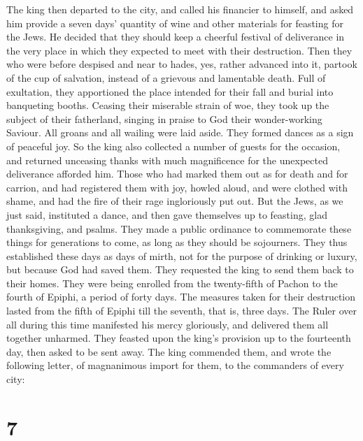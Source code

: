  The king then departed to the city, and called his
financier to himself, and asked him provide a seven days' quantity of
wine and other materials for feasting for the Jews. He decided that they
should keep a cheerful festival of deliverance in the very place in
which they expected to meet with their destruction.  Then
they who were before despised and near to hades, yes, rather advanced
into it, partook of the cup of salvation, instead of a grievous and
lamentable death. Full of exultation, they apportioned the place
intended for their fall and burial into banqueting booths. 
Ceasing their miserable strain of woe, they took up the subject of their
fatherland, singing in praise to God their wonder-working Saviour. All
groans and all wailing were laid aside. They formed dances as a sign of
peaceful joy.  So the king also collected a number of
guests for the occasion, and returned unceasing thanks with much
magnificence for the unexpected deliverance afforded him. 
Those who had marked them out as for death and for carrion, and had
registered them with joy, howled aloud, and were clothed with shame, and
had the fire of their rage ingloriously put out.  But the
Jews, as we just said, instituted a dance, and then gave themselves up
to feasting, glad thanksgiving, and psalms.  They made a
public ordinance to commemorate these things for generations to come, as
long as they should be sojourners. They thus established these days as
days of mirth, not for the purpose of drinking or luxury, but because
God had saved them.  They requested the king to send them
back to their homes.  They were being enrolled from the
twenty-fifth of Pachon to the fourth of Epiphi, a period of forty days.
The measures taken for their destruction lasted from the fifth of Epiphi
till the seventh, that is, three days.  The Ruler over all
during this time manifested his mercy gloriously, and delivered them all
together unharmed.  They feasted upon the king's provision
up to the fourteenth day, then asked to be sent away.  The
king commended them, and wrote the following letter, of magnanimous
import for them, to the commanders of every city:

\hypertarget{section-6}{%
\section{7}\label{section-6}}

